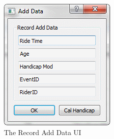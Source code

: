 \begin{figure}
\includegraphics[width=\textwidth]{./Maintenance/UI/RecordAD.png}
\caption{The Record Add Data UI} \label{fig:RecordAD_UI}
\end{figure}

